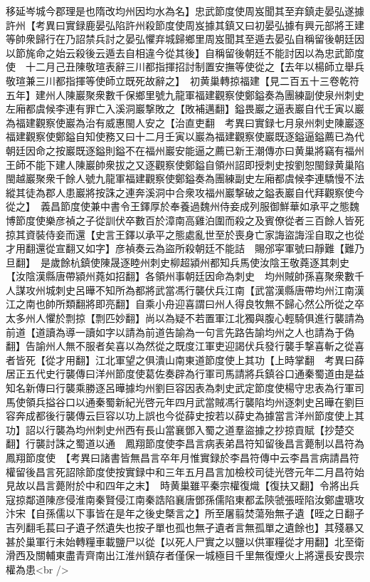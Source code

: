 移延岑城今郡理是也隋改均州因均水為名】忠武節度使周岌聞其至弃鎮走晏弘遂據許州【考異曰實録鹿晏弘陷許州殺節度使周岌據其鎮又曰初晏弘據有興元部將王建等帥衆歸行在乃詔禁兵討之晏弘懼弃城歸鄉里周岌聞其至遁去晏弘自稱留後朝廷因以節旄命之始云殺後云遁去自相違今從其後】自稱留後朝廷不能討因以為忠武節度使　十二月己丑陳敬瑄表辭三川都指揮招討制置安撫等使從之【去年以楊師立舉兵敬瑄兼三川都指揮等使師立既死故辭之】　初黄巢轉掠福建【見二百五十三卷乾符五年】建州人陳巖聚衆數千保鄉里號九龍軍福建觀察使鄭鎰奏為團練副使泉州刺史左廂都虞候李連有罪亡入溪洞巖撃敗之【敗補邁翻】鎰畏巖之逼表巖自代壬寅以巖為福建觀察使巖為治有威惠閩人安之【治直吏翻　考異曰實録七月泉州刺史陳巖逐福建觀察使鄭鎰自知使務又曰十二月壬寅以巖為福建觀察使巖既逐鎰逼鎰薦已為代朝廷因命之按巖既逐鎰則鎰不在福州巖安能逼之薦已新王潮傳亦曰黄巢將竊有福州王師不能下建人陳巖帥衆拔之又逐觀察使鄭鎰自領州詔即授刺史按劉恕閩録黄巢陷閩越巖聚衆千餘人號九龍軍福建觀察使鄭鎰奏為團練副史左廂都虞候李連驕慢不法縱其徒為郡人患巖將按誅之連奔溪洞中合衆攻福州巖撃破之鎰表巖自代拜觀察使今從之】　義昌節度使兼中書令王鐸厚於奉養過魏州侍妾成列服御鮮華如承平之態魏博節度使樂彦禎之子從訓伏卒數百於漳南高雞泊圍而殺之及賓僚從者三百餘人皆死掠其資裝侍妾而還【史言王鐸以承平之態處亂世至於喪身亡家誨盜誨淫自取之也從才用翻還從宣翻又如字】彦禎奏云為盜所殺朝廷不能詰　賜邠寜軍號曰靜難【難乃旦翻】　是歲餘杭鎮使陳晟逐睦州刺史柳超潁州都知兵馬使汝陰王敬蕘逐其刺史【汝陰漢縣唐帶潁州蕘如招翻】各領州事朝廷因命為刺史　均州賊帥孫喜聚衆數千人謀攻州城刺史呂曄不知所為都將武當馮行襲伏兵江南【武當漢縣唐帶均州江南漢江之南也帥所類翻將即亮翻】自乘小舟迎喜謂曰州人得良牧無不歸心然公所從之卒太多州人懼於剽掠【剽匹妙翻】尚以為疑不若置軍江北獨與腹心輕騎俱進行襲請為前道【道讀為導一讀如字以請為前道告諭為一句言先路告諭均州之人也請為于偽翻】告諭州人無不服者矣喜以為然從之既度江軍吏迎謁伏兵發行襲手撃喜斬之從喜者皆死【從才用翻】江北軍望之俱潰山南東道節度使上其功【上時掌翻　考異曰薛居正五代史行襲傳曰洋州節度使葛佐奏辟為行軍司馬請將兵鎮谷口通秦蜀道由是益知名新傳曰行襲乘勝逐呂曄據均州劉巨容因表為刺史武定節度使楊守忠表為行軍司馬使領兵搤谷口以通秦蜀新紀光啓元年四月武當賊馮行襲陷均州逐刺史呂曄在劉巨容奔成都後行襲傳云巨容以功上誤也今從薛史按若以薛史為據當言洋州節度使上其功】詔以行襲為均州刺史州西有長山當襄鄧入蜀之道羣盜據之抄掠貢賦【抄楚交翻】行襲討誅之蜀道以通　鳳翔節度使李昌言病表弟昌符知留後昌言薨制以昌符為鳳翔節度使　【考異曰諸書皆無昌言卒年月惟實録於李昌符傳中云李昌言病請昌符權留後昌言死詔除節度使按實録中和三年五月昌言加檢校司徒光啓元年二月昌符始見故以昌言薨附於中和四年之末】　時黄巢雖平秦宗權復熾【復扶又翻】令將出兵寇掠鄰道陳彦侵淮南秦賢侵江南秦誥陷襄唐鄧孫儒陷東都孟陝虢張晊陷汝鄭盧瑭攻汴宋【自孫儒以下事皆在是年之後史槩言之】所至屠翦焚蕩殆無孑遺【晊之日翻孑吉列翻毛萇曰孑遺孑然遺失也按孑單也孤也無孑遺者言無孤單之遺餘也】其殘暴又甚於巢軍行未始轉糧車載鹽尸以從【以死人尸實之以鹽以供軍糧從才用翻】北至衛滑西及關輔東盡青齊南出江淮州鎮存者僅保一城極目千里無復煙火上將還長安畏宗權為患<br />
